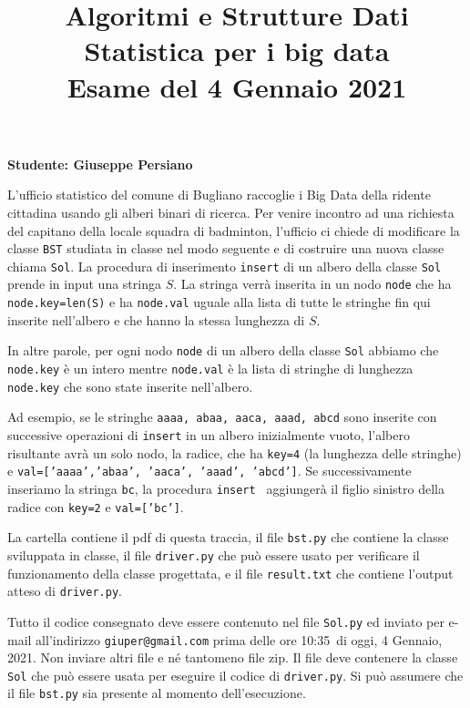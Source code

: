 \documentclass{amsart}
\begin{document}
\title{Algoritmi e Strutture Dati\\
Statistica per i big data\\
Esame del 4 Gennaio 2021
}


\newcommand{\NomeStudente}{Giuseppe Persiano}
\newcommand{\nomeClasse}{{\tt{Sol}}}
\newcommand{\nomeMetodo}{{\tt{nuovo}}}
\newcommand{\oraconsegna}{10:35}
\newcommand{\dataoggi}{4 Gennaio, 2021}


\maketitle

\hfill{{\bf Studente: \NomeStudente}}

\smallskip
L'ufficio statistico del comune di Bugliano raccoglie i Big Data  della
ridente cittadina usando gli alberi binari di ricerca.
Per venire incontro ad una richiesta del capitano della locale squadra
di badminton, l'ufficio ci chiede di modificare la classe {\tt BST} 
studiata in classe nel modo seguente e di costruire una nuova classe
chiama {\nomeClasse}.
La procedura di inserimento {\tt insert} di un albero della classe 
{\nomeClasse} prende in input una stringa $S$.
La stringa verr\`a inserita in un nodo {\tt node} che ha 
{\tt node.key=len(S)} e ha {\tt node.val} uguale alla lista
di tutte le stringhe fin qui inserite nell'albero e che hanno
la stessa lunghezza di $S$.

In altre parole, per ogni nodo {\tt node} di un
albero della classe {\nomeClasse} abbiamo che
 {\tt node.key} \`e un intero
mentre {\tt node.val} \`e la lista di stringhe di lunghezza {\tt node.key}
che sono state inserite nell'albero.

\smallskip
Ad esempio, se le stringhe 
{\tt aaaa, abaa, aaca, aaad, abcd} sono inserite con successive operazioni 
di {\tt insert} in un albero inizialmente vuoto,
l'albero risultante avr\`a un solo nodo,
la radice, che ha {\tt key=4} (la lunghezza delle stringhe)
e {\tt val=['aaaa','abaa', 'aaca', 'aaad', 'abcd']}.
Se successivamente inseriamo la stringa {\tt bc}, 
la procedura {\tt insert } aggiunger\`a il figlio sinistro della radice
con {\tt key=2}  e {\tt val=['bc']}.


\medskip{}
La cartella contiene il pdf di questa traccia, il file
{\tt bst.py} che contiene la classe sviluppata in classe,
il file {\tt driver.py} che pu\`o essere usato
per verificare il funzionamento della classe progettata, e il file  {\tt result.txt} che contiene
l'output atteso di {\tt driver.py}.

\medskip{}
Tutto il codice consegnato deve essere contenuto nel file
{\tt \nomeClasse .py} ed inviato per e-mail all'indirizzo
{\tt giuper@gmail.com} prima delle ore \oraconsegna\ di oggi, 
\dataoggi. Non inviare altri file e n\'e tantomeno file zip.
Il file deve contenere la classe {\tt \nomeClasse}  
che pu\`o essere usata per eseguire
il codice di {\tt driver.py}. Si pu\`o assumere che il file
{\tt bst.py} sia presente al momento dell'esecuzione. 
\end{document}

